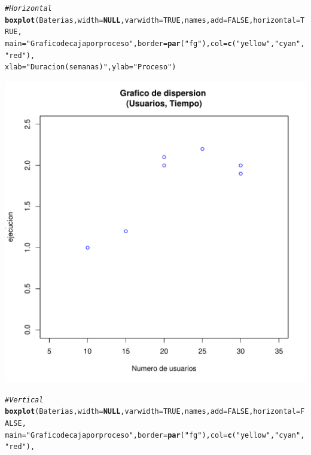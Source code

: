 \documentclass[12pt,letterpaper]{article}\usepackage[]{graphicx}\usepackage[]{color}
\makeatletter
\def\maxwidth{ %
  \ifdim\Gin@nat@width>\linewidth
    \linewidth
  \else
    \Gin@nat@width
  \fi
}
\newcommand{\hlnum}[1]{\textcolor[rgb]{0.686,0.059,0.569}{#1}}%
\newcommand{\hlstr}[1]{\textcolor[rgb]{0.192,0.494,0.8}{#1}}%
\newcommand{\hlcom}[1]{\textcolor[rgb]{0.678,0.584,0.686}{\textit{#1}}}%
\newcommand{\hlstd}[1]{\textcolor[rgb]{0.345,0.345,0.345}{#1}}%
\newcommand{\hlkwa}[1]{\textcolor[rgb]{0.161,0.373,0.58}{\textbf{#1}}}%
\newcommand{\hlkwc}[1]{\textcolor[rgb]{0.333,0.667,0.333}{#1}}%
\newcommand{\hlkwd}[1]{\textcolor[rgb]{0.737,0.353,0.396}{\textbf{#1}}}%
\newenvironment{kframe}{%
 \def\at@end@of@kframe{}%
 \ifinner\ifhmode%
  \def\at@end@of@kframe{\end{minipage}}%
  \begin{minipage}{\columnwidth}%
 \fi\fi%
 \def\FrameCommand##1{\hskip\@totalleftmargin \hskip-\fboxsep
 \colorbox{shadecolor}{##1}\hskip-\fboxsep
     \hskip-\linewidth \hskip-\@totalleftmargin \hskip\columnwidth}%
 \MakeFramed {\advance\hsize-\width
   \@totalleftmargin\z@ \linewidth\hsize
   \@setminipage}}%
 {\par\unskip\endMakeFramed%
 \at@end@of@kframe}
\newenvironment{knitrout}{}{} %
\makeatother
\begin{document}
\begin{knitrout}
\color{fgcolor}\begin{kframe}
\begin{alltt}
\hlcom{# Horizontal}
\hlkwd{boxplot}\hlstd{(Baterias,} \hlkwc{width}\hlstd{=}\hlkwa{NULL}\hlstd{,} \hlkwc{varwidth}\hlstd{=}\hlnum{TRUE}\hlstd{, names,} \hlkwc{add}\hlstd{=} \hlnum{FALSE}\hlstd{,} \hlkwc{horizontal} \hlstd{=} \hlnum{TRUE}\hlstd{,}
\hlkwc{main}\hlstd{=}\hlstr{"Grafico de caja por proceso"}\hlstd{,} \hlkwc{border}\hlstd{=}\hlkwd{par}\hlstd{(}\hlstr{"fg"}\hlstd{),} \hlkwc{col}\hlstd{=}\hlkwd{c}\hlstd{(}\hlstr{"yellow"}\hlstd{,} \hlstr{"cyan"}\hlstd{,} \hlstr{"red"}\hlstd{),}
\hlkwc{xlab} \hlstd{=}\hlstr{"Duracion (semanas)"}\hlstd{,} \hlkwc{ylab}\hlstd{=}\hlstr{"Proceso"}\hlstd{)}
\end{alltt}
\end{kframe}
\includegraphics[width=\maxwidth]{figure/unnamed-chunk-10-1} 
\begin{kframe}\begin{alltt}
\hlcom{# Vertical}
\hlkwd{boxplot}\hlstd{(Baterias,} \hlkwc{width}\hlstd{=}\hlkwa{NULL}\hlstd{,} \hlkwc{varwidth}\hlstd{=}\hlnum{TRUE}\hlstd{, names,} \hlkwc{add}\hlstd{=} \hlnum{FALSE}\hlstd{,} \hlkwc{horizontal} \hlstd{=} \hlnum{FALSE}\hlstd{,}
\hlkwc{main}\hlstd{=}\hlstr{"Grafico de caja por proceso"}\hlstd{,} \hlkwc{border}\hlstd{=}\hlkwd{par}\hlstd{(}\hlstr{"fg"}\hlstd{),} \hlkwc{col}\hlstd{=}\hlkwd{c}\hlstd{(}\hlstr{"yellow"}\hlstd{,} \hlstr{"cyan"}\hlstd{,} \hlstr{"red"}\hlstd{),}

\end{alltt}
\end{kframe}
\end{knitrout}
\end{document}

